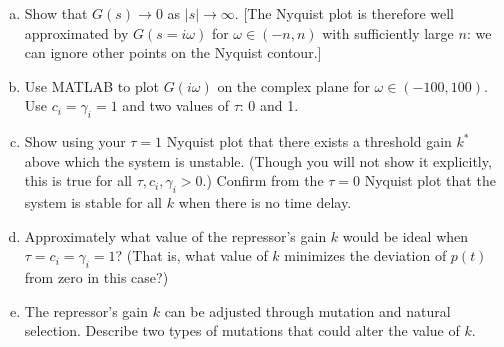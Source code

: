 \documentclass{article}
\begin{document}
\begin{enumerate}[a)]
\setlength{\itemsep}{0pt}
\setcounter{enumi}{5}
\item Show that $G(s) \to 0$ as $|s| \to \infty$. [The Nyquist plot is therefore well approximated by $G(s=i\omega)$ for $\omega \in (-n, n)$ with sufficiently large $n$: we can ignore other points on the Nyquist contour.]
\item Use MATLAB to plot $G(i\omega)$ on the complex plane for $\omega \in (-100, 100)$. Use $c_i=\gamma_i=1$ and two values of $\tau$: 0 and 1.
\item Show using your $\tau=1$ Nyquist plot that there exists a threshold gain $k^*$ above which the system is unstable. (Though you will not show it explicitly, this is true for all $\tau,c_i, \gamma_i>0$.) Confirm from the $\tau=0$ Nyquist plot that the system is stable for all $k$ when there is no time delay.
\item Approximately what value of the repressor's gain $k$ would be ideal when $\tau=c_i=\gamma_i=1$? (That is, what value of $k$ minimizes the deviation of $p(t)$ from zero in this case?)
\item The repressor's gain $k$ can be adjusted through mutation and natural selection. Describe two types of mutations that could alter the value of $k$.
\end{enumerate}
\end{document}
